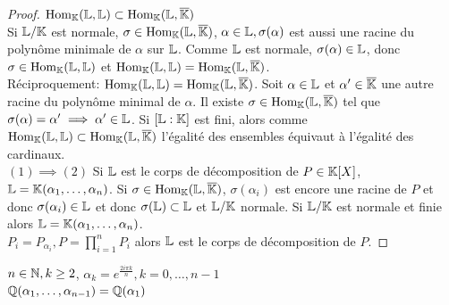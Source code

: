 \documentclass[]{report}
\begin{document}
    \begin{proof}
        $\text{Hom}_{\mathbb{K}}(\mathbb{L},\mathbb{L})\subset \text{Hom}_{\mathbb{K}}(\mathbb{L},\overline{\mathbb{K}})$\\
        Si $\mathbb{L}/\mathbb{K}$ est normale, $\sigma\in \text{Hom}_{\mathbb{K}}(\mathbb{L},\overline{\mathbb{K}})$, $\alpha\in \mathbb{L},\sigma(\alpha)$ est aussi une racine du polynôme minimale de $\alpha$ sur $\mathbb{L}$. Comme $\mathbb{L}$ est normale, $\sigma(\alpha)\in \mathbb{L}$, donc $\sigma\in\text{Hom}_{\mathbb{K}}(\mathbb{L},\mathbb{L})$ et $\text{Hom}_{\mathbb{K}}(\mathbb{L},\mathbb{L})=\text{Hom}_{\mathbb{K}}(\mathbb{L},\overline{\mathbb{K}})$.\\
        Réciproquement: $\text{Hom}_{\mathbb{K}}(\mathbb{L},\mathbb{L})=\text{Hom}_{\mathbb{K}}(\mathbb{L},\overline{\mathbb{K}})$. Soit $\alpha\in \mathbb{L}$ et $\alpha'\in \overline{\mathbb{K}}$ une autre racine du polynôme minimal de $\alpha$. Il existe $\sigma\in \text{Hom}_{\mathbb{K}}(\mathbb{L},\overline{\mathbb{K}})$ tel que $\sigma(\alpha)=\alpha'\implies \alpha'\in \mathbb{L}$. Si $[\mathbb{L}:\mathbb{K}]$ est fini, alors comme $\text{Hom}_{\mathbb{K}}(\mathbb{L},\mathbb{L})\subset \text{Hom}_{\mathbb{K}}(\mathbb{L},\overline{\mathbb{K}})$ l'égalité des ensembles équivaut à l'égalité des cardinaux.\\
        $(1)\implies (2)$ Si $\mathbb{L}$ est le corps de décomposition de $P\in \mathbb{K}[X]$, $\mathbb{L}=\mathbb{K}(\alpha_1,\ldots,\alpha_n)$. Si $\sigma\in \text{Hom}_{\mathbb{K}}(\mathbb{L},\overline{\mathbb{K}})$, $\sigma(\alpha_i)$ est encore une racine de $P$ et donc $\sigma(\alpha_i)\in \mathbb{L}$ et donc $\sigma(\mathbb{L})\subset \mathbb{L}$ et $\mathbb{L}/\mathbb{K}$ normale. Si $\mathbb{L}/\mathbb{K}$ est normale et finie alors $\mathbb{L}=\mathbb{K}(\alpha_1,\ldots,\alpha_n)$.\\
        $P_i=P_{\alpha_i}, P=\prod_{i=1}^{n}P_i$ alors $\mathbb{L}$ est le corps de décomposition de $P$.
    \end{proof}

    \begin{ex}{}{}
        ${n\in\mathbb{N}},k\ge 2$, $\alpha_k=e^{\frac{2i\pi k}{n}},k=0,\ldots,n-1$\\
        $\mathbb{Q}(\alpha_1,\ldots,\alpha_{n-1})=\mathbb{Q}(\alpha_1)$
    \end{ex}
\end{document}
